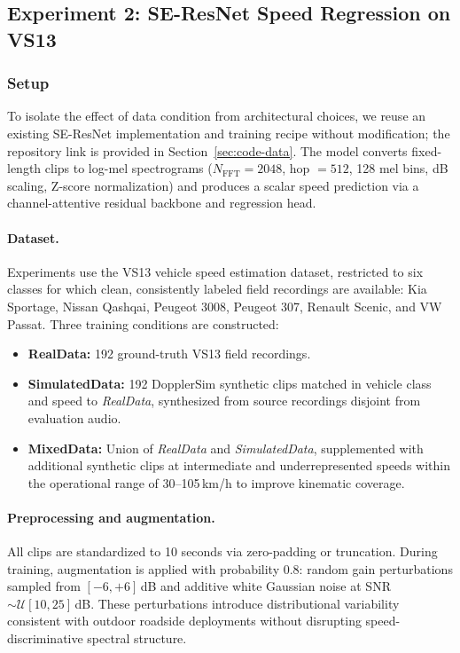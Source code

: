 \documentclass{article}
\begin{document}
\subsection{Experiment 2: SE-ResNet Speed Regression on VS13}
\label{sec:exp2}

\subsubsection{Setup}

To isolate the effect of data condition from architectural choices, we reuse an existing SE-ResNet implementation and training recipe without modification; the repository link is provided in Section~\ref{sec:code-data}. The model converts fixed-length clips to log-mel spectrograms ($N_{\mathrm{FFT}}=2048$, hop $=512$, 128 mel bins, dB scaling, Z-score normalization) and produces a scalar speed prediction via a channel-attentive residual backbone and regression head.

\paragraph{Dataset.} Experiments use the VS13 vehicle speed estimation dataset, restricted to six classes for which clean, consistently labeled field recordings are available: Kia Sportage, Nissan Qashqai, Peugeot 3008, Peugeot 307, Renault Scenic, and VW Passat. Three training conditions are constructed:

\begin{itemize}
  \item \textbf{RealData:} 192 ground-truth VS13 field recordings.
  \item \textbf{SimulatedData:} 192 DopplerSim synthetic clips matched in vehicle class and speed to \textit{RealData}, synthesized from source recordings disjoint from evaluation audio.
  \item \textbf{MixedData:} Union of \textit{RealData} and \textit{SimulatedData}, supplemented with additional synthetic clips at intermediate and underrepresented speeds within the operational range of 30--105\,km/h to improve kinematic coverage.
\end{itemize}

\paragraph{Preprocessing and augmentation.} All clips are standardized to 10 seconds via zero-padding or truncation. During training, augmentation is applied with probability 0.8: random gain perturbations sampled from $[-6, +6]$\,dB and additive white Gaussian noise at SNR $\sim\mathcal{U}[10, 25]$\,dB. These perturbations introduce distributional variability consistent with outdoor roadside deployments without disrupting speed-discriminative spectral structure.
\end{document}
